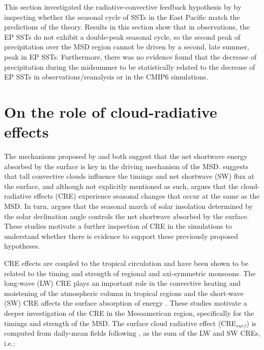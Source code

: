 This section investigated the radiative-convective feedback hypothesis by \cite{magana1999} by inspecting whether the seasonal cycle of SSTs in the East Pacific match the predictions of the theory. 
Results in this section show that in observations, the EP SSTs do not exhibit a double-peak seasonal cycle, so the second peak of precipitation over the MSD region cannot be driven by a second, late summer, peak in EP SSTs. Furthermore, there was no evidence found that the decrease of precipitation during the midsummer to be statistically related to the decrease of EP SSTs in observations/reanalysis or in the CMIP6 simulations. 

\section{On the role of cloud-radiative effects}


The mechanisms proposed by \cite{magana1999} and \cite{karnauskas2013} both suggest that the net shortwave energy absorbed by the surface is key in the driving mechanism of the MSD. \cite{magana1999} suggests that tall convective clouds influence the timings and net shortwave (SW) flux at the surface, and although not explicitly mentioned as such, \cite{magana1999} argues that the cloud-radiative effects (CRE) experience seasonal changes that occur at the same as the MSD. In turn, \cite{karnauskas2013} argues that the seasonal march of solar insolation determined by the solar declination angle controls the net shortwave absorbed by the surface. These studies motivate a further inspection of CRE in the simulations to understand whether there is evidence to support these previously proposed hypotheses.



CRE effects are coupled to the tropical circulation \citep{bony2004dynamic,webb2017} and have been shown to be related to the timing and strength of regional \citep{guo2015} and axi-symmetric \citep{byrne2020} monsoons. The long-wave (LW) CRE plays an important role in the convective heating and moistening of the atmospheric column in tropical regions and the short-wave (SW) CRE affects the surface absorption of energy \citep{allan2011}. 
These studies motivate a deeper investigation of the CRE in the Mesoamerican region, specifically for the timings and strength of the MSD. The surface cloud radiative effect (CRE$_{surf}$) is computed from daily-mean fields following \cite{allan2011}, as the sum of the LW and SW CREs, i.e.:


